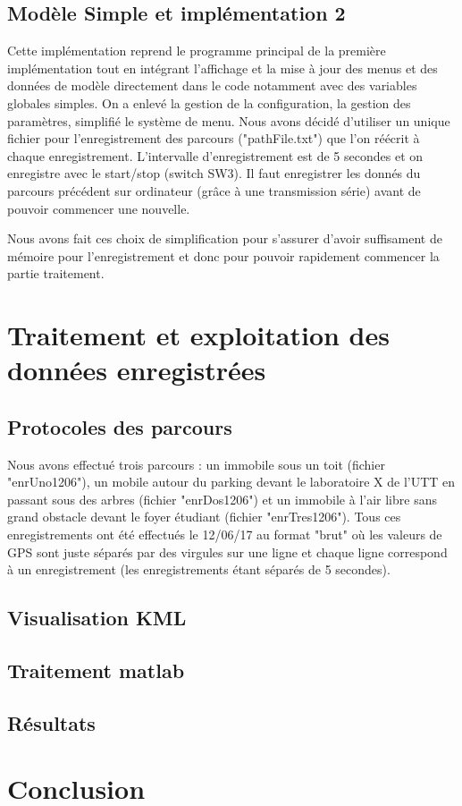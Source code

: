 \documentclass{report}
\begin{document}
\section{Modèle Simple et implémentation 2}

Cette implémentation reprend le programme principal de la première
implémentation tout en intégrant l'affichage et la mise à jour des 
menus et des données de modèle directement dans le code notamment
avec des variables globales simples. On a enlevé la gestion de la
configuration, la gestion des paramètres, simplifié le système de menu.
Nous avons décidé d'utiliser un unique fichier pour l'enregistrement des
parcours ("pathFile.txt") que l'on réécrit à chaque enregistrement. L'intervalle
d'enregistrement est de 5 secondes et on enregistre avec le start/stop
(switch SW3). Il faut enregistrer les donnés du parcours précédent
sur ordinateur (grâce à une transmission série) avant de pouvoir
commencer une nouvelle.

Nous avons fait ces choix de simplification pour s'assurer d'avoir
 suffisament de mémoire pour l'enregistrement et donc pour pouvoir rapidement commencer la partie traitement.



\chapter{Traitement et exploitation des données enregistrées}
\section{Protocoles des parcours}
Nous avons effectué trois parcours : un immobile sous un toit (fichier
"enrUno1206"), un mobile autour du parking devant le laboratoire X de
l'UTT en passant sous des arbres (fichier "enrDos1206") et un immobile à l'air libre sans grand obstacle devant le foyer étudiant (fichier 
"enrTres1206").
Tous ces enregistrements ont été effectués le 12/06/17 au format "brut"
où les valeurs de GPS sont juste séparés par des virgules sur une ligne
et chaque ligne correspond à un enregistrement (les enregistrements
étant séparés de 5 secondes).
\section{Visualisation KML}
\section{Traitement matlab}
\section{Résultats}

\chapter{Conclusion}
\end{document}
